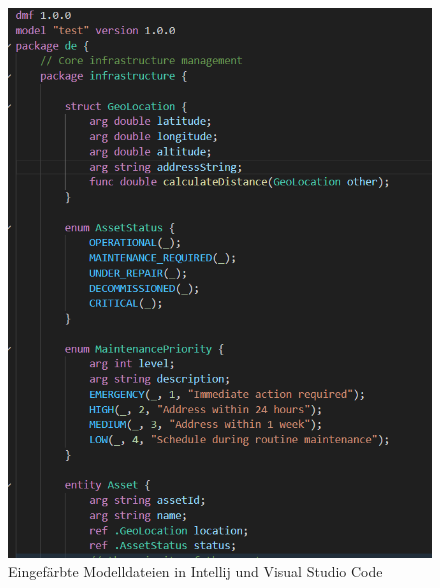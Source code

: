 \documentclass[./einleitung.tex]{subfiles}
\begin{document}
\begin{figure}[H]
        \includegraphics[width=\linewidth / 2 - 1em]{bilder/semanticVscode}
        \caption{Eingefärbte Modelldateien in Intellij und Visual Studio Code}
        \label{fig:semanticintellij}
    \end{figure}
\end{document}
